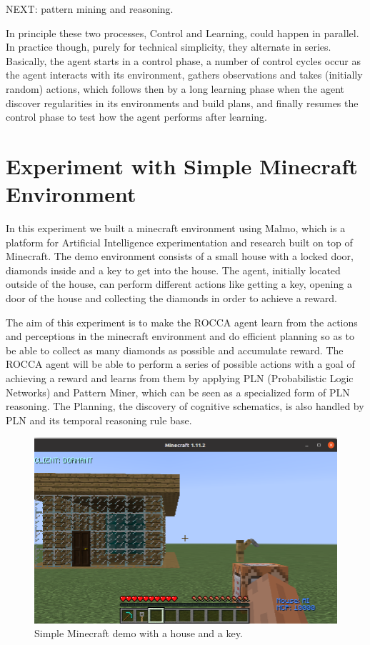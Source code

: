 \documentclass[runningheads]{llncs}
\begin{document}
NEXT: pattern mining and reasoning.

In principle these two processes, Control and Learning, could happen
in parallel.  In practice though, purely for technical simplicity,
they alternate in series.  Basically, the agent starts in a control
phase, a number of control cycles occur as the agent interacts with
its environment, gathers observations and takes (initially random)
actions, which follows then by a long learning phase when the agent
discover regularities in its environments and build plans, and finally
resumes the control phase to test how the agent performs after
learning.

\section{Experiment with Simple Minecraft Environment}

In this experiment we built a minecraft environment using Malmo, which is a platform for Artificial Intelligence experimentation and research built on top of Minecraft. The demo environment consists of a small house with a locked door, diamonds inside and a key to get into the house. The agent, initially located outside of the house, can perform different actions like getting a key, opening a door of the house and collecting the diamonds in order to achieve a reward. \par
The aim of this experiment is to make the ROCCA agent learn from the actions and perceptions in the minecraft environment and do efficient planning so as to be able to collect as many diamonds as possible and accumulate reward. The ROCCA agent will be able to perform a series of possible actions with a goal of achieving a reward and learns from them by applying PLN (Probabilistic Logic Networks) and Pattern Miner, which can be seen as a specialized form of PLN reasoning. The Planning, the discovery of cognitive schematics, is also handled by PLN and its temporal reasoning rule base.

\begin{figure}[htbp]
\centerline{\includegraphics[scale=.2]{pictures/simple_demo.png}}
\caption{Simple Minecraft demo with a house and a key.}
\label{fig}
\end{figure}
\end{document}
